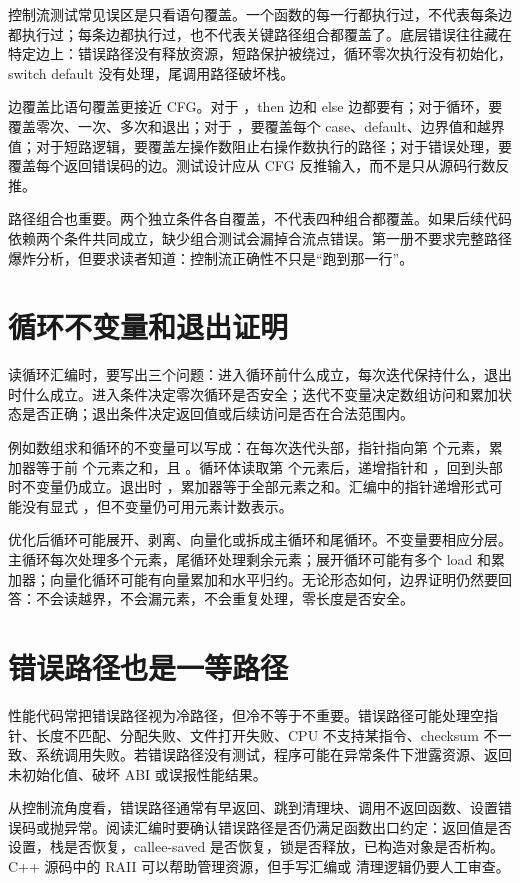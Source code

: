 控制流测试常见误区是只看语句覆盖。一个函数的每一行都执行过，不代表每条边都执行过；每条边都执行过，也不代表关键路径组合都覆盖了。底层错误往往藏在特定边上：错误路径没有释放资源，短路保护被绕过，循环零次执行没有初始化，switch default 没有处理，尾调用路径破坏栈。

边覆盖比语句覆盖更接近 CFG。对于 ，then 边和 else 边都要有；对于循环，要覆盖零次、一次、多次和退出；对于 ，要覆盖每个 case、default、边界值和越界值；对于短路逻辑，要覆盖左操作数阻止右操作数执行的路径；对于错误处理，要覆盖每个返回错误码的边。测试设计应从 CFG 反推输入，而不是只从源码行数反推。

路径组合也重要。两个独立条件各自覆盖，不代表四种组合都覆盖。如果后续代码依赖两个条件共同成立，缺少组合测试会漏掉合流点错误。第一册不要求完整路径爆炸分析，但要求读者知道：控制流正确性不只是“跑到那一行”。

\section{循环不变量和退出证明}

读循环汇编时，要写出三个问题：进入循环前什么成立，每次迭代保持什么，退出时什么成立。进入条件决定零次循环是否安全；迭代不变量决定数组访问和累加状态是否正确；退出条件决定返回值或后续访问是否在合法范围内。

例如数组求和循环的不变量可以写成：在每次迭代头部，指针指向第  个元素，累加器等于前  个元素之和，且 。循环体读取第  个元素后，递增指针和 ，回到头部时不变量仍成立。退出时 ，累加器等于全部元素之和。汇编中的指针递增形式可能没有显式 ，但不变量仍可用元素计数表示。

优化后循环可能展开、剥离、向量化或拆成主循环和尾循环。不变量要相应分层。主循环每次处理多个元素，尾循环处理剩余元素；展开循环可能有多个 load 和累加器；向量化循环可能有向量累加和水平归约。无论形态如何，边界证明仍然要回答：不会读越界，不会漏元素，不会重复处理，零长度是否安全。

\section{错误路径也是一等路径}

性能代码常把错误路径视为冷路径，但冷不等于不重要。错误路径可能处理空指针、长度不匹配、分配失败、文件打开失败、CPU 不支持某指令、checksum 不一致、系统调用失败。若错误路径没有测试，程序可能在异常条件下泄露资源、返回未初始化值、破坏 ABI 或误报性能结果。

从控制流角度看，错误路径通常有早返回、跳到清理块、调用不返回函数、设置错误码或抛异常。阅读汇编时要确认错误路径是否仍满足函数出口约定：返回值是否设置，栈是否恢复，callee-saved 是否恢复，锁是否释放，已构造对象是否析构。C++ 源码中的 RAII 可以帮助管理资源，但手写汇编或  清理逻辑仍要人工审查。

